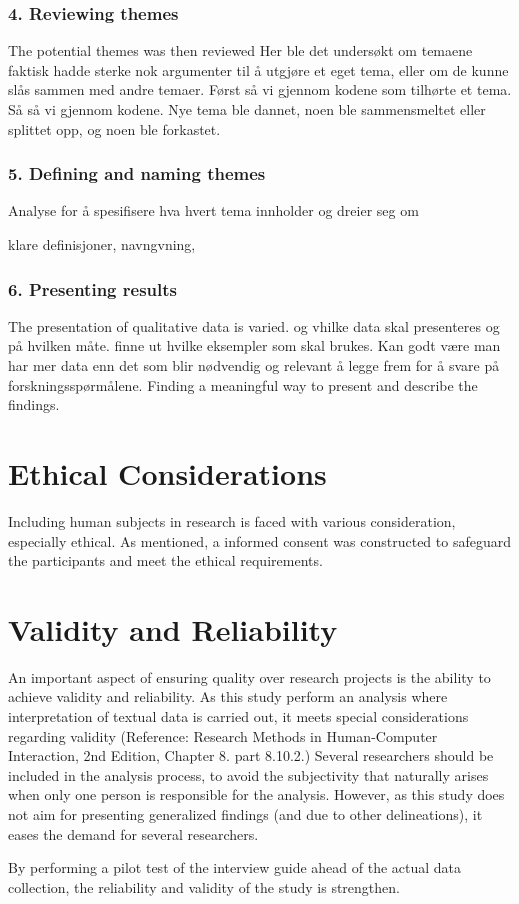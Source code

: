     \subsubsection{4. Reviewing themes}
The potential themes was then reviewed 
Her ble det undersøkt om temaene faktisk hadde sterke nok argumenter til å utgjøre et eget tema, eller om de kunne slås sammen med andre temaer. 
Først så vi gjennom kodene som tilhørte et tema. Så så vi gjennom kodene. Nye tema ble dannet, noen ble sammensmeltet eller splittet opp, og noen ble forkastet. 

    \subsubsection{5. Defining and naming themes}
Analyse for å spesifisere hva hvert tema innholder og dreier seg om

klare definisjoner, navngvning, 
    
    \subsubsection{6. Presenting results}
    The presentation of qualitative data is varied. og vhilke data skal presenteres og på hvilken måte. finne ut hvilke eksempler som skal brukes. Kan godt være man har mer data enn det som blir nødvendig og relevant å legge frem for å svare på forskningsspørmålene. 
    Finding a meaningful way to present and describe the findings. 

\section{Ethical Considerations}
Including human subjects in research is faced with various consideration, especially ethical. As mentioned, a informed consent was constructed to safeguard the participants and meet the ethical requirements. 


\section{Validity and Reliability}

An important aspect of ensuring quality over research projects is the ability to achieve validity and reliability. As this study perform an analysis where interpretation of textual data is carried out, it meets special considerations regarding validity (Reference: Research Methods in Human-Computer Interaction, 2nd Edition, Chapter 8. part 8.10.2.) Several researchers should be included in the analysis process, to avoid the subjectivity that naturally arises when only one person is responsible for the analysis. However, as this study does not aim for presenting generalized findings (and due to other delineations), it eases the demand for several researchers. 

By performing a pilot test of the interview guide ahead of the actual data collection, the reliability and validity of the study is strengthen.







